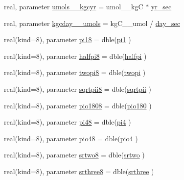 \begin{DoxyCompactItemize}
\item 
real, parameter \hyperlink{namespaceconsts__coms_a80027bcbb9d21498f86d1dc0d0c856e9}{umols\+\_\+\_\+kgcyr} = umol\+\_\+\_\+kgC $\ast$ \hyperlink{namespaceconsts__coms_ae3a6000a33c9aa556d49b173b86f3b49}{yr\+\_\+sec}
\item 
real, parameter \hyperlink{namespaceconsts__coms_ac60998ed6a6470c03f18f773175c77f4}{kgcday\+\_\+\_\+umols} = kg\+C\+\_\+\_\+umol / \hyperlink{namespaceconsts__coms_a3ff38434ac06e17e92b1929696b56611}{day\+\_\+sec}
\item 
real(kind=8), parameter \hyperlink{namespaceconsts__coms_a5bd1925089f1e1e701a194a3cd46e231}{pi18} = dble(\hyperlink{namespaceconsts__coms_ae7b07ddab326c63b9c81a9c607cb79f8}{pi1} )
\item 
real(kind=8), parameter \hyperlink{namespaceconsts__coms_acf446d5c999d6f8574b77c92e6865da5}{halfpi8} = dble(\hyperlink{namespaceconsts__coms_abbda065eaf0f93e7f1f973705faf75ea}{halfpi} )
\item 
real(kind=8), parameter \hyperlink{namespaceconsts__coms_ab728c4b63f956137bc8a94c8ba42c675}{twopi8} = dble(\hyperlink{namespaceconsts__coms_a1e788efd80b24feef7cf49effb1c3106}{twopi} )
\item 
real(kind=8), parameter \hyperlink{namespaceconsts__coms_ac4df29a8f6a46e9631d4db71c20e8f7d}{sqrtpii8} = dble(\hyperlink{namespaceconsts__coms_a7ccaba833293a307822d6d2e4e58b992}{sqrtpii} )
\item 
real(kind=8), parameter \hyperlink{namespaceconsts__coms_a6ae896a14b40bb0f430a950730e58d8a}{pio1808} = dble(\hyperlink{namespaceconsts__coms_a42c7511eb2987c443fbfb41d92142b8f}{pio180} )
\item 
real(kind=8), parameter \hyperlink{namespaceconsts__coms_affa58f83c899d90c43e413c5ef490e2c}{pi48} = dble(\hyperlink{namespaceconsts__coms_a9ab90617058485a809d50b5bf043eda4}{pi4} )
\item 
real(kind=8), parameter \hyperlink{namespaceconsts__coms_abab446622b05b70fe152b8ce68c3d2ab}{pio48} = dble(\hyperlink{namespaceconsts__coms_a54e6b465d8b81b90409f351986d2a4de}{pio4} )
\item 
real(kind=8), parameter \hyperlink{namespaceconsts__coms_a3cc8958e1839e97fd0518a4597b913a8}{srtwo8} = dble(\hyperlink{namespaceconsts__coms_ad2093037aef885081f727f22fe6b2554}{srtwo} )
\item 
real(kind=8), parameter \hyperlink{namespaceconsts__coms_a8dbf0a0b3abb2d077c183c16821735b9}{srthree8} = dble(\hyperlink{namespaceconsts__coms_a17913c8f0ccea4623bad63371995c51f}{srthree} )

\end{DoxyCompactItemize}
